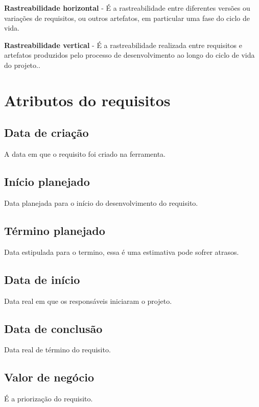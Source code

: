 	\textbf{Rastreabilidade horizontal} - É a rastreabilidade entre diferentes versões ou variações de requisitos, ou outros artefatos, em particular uma fase do ciclo de vida\cite{tese_doutorado}.

	\textbf{Rastreabilidade vertical} - É a rastreabilidade realizada entre requisitos e artefatos produzidos pelo processo de desenvolvimento ao longo do ciclo de vida do projeto.\cite{tese_doutorado}.

	\section{Atributos do requisitos}
	\subsection{Data de criação}
	A data em que o requisito foi criado na ferramenta.
	\subsection{Início planejado}
	Data planejada para o início do desenvolvimento do requisito.
	\subsection{Término planejado}
	Data estipulada para o termino, essa é uma estimativa pode sofrer atrasos.
	\subsection{Data de início}
	Data real em que os responsáveis iniciaram o projeto.
	\subsection{Data de conclusão}
	Data real de término do requisito.
	\subsection{Valor de negócio}
	É a priorização do requisito.
	
